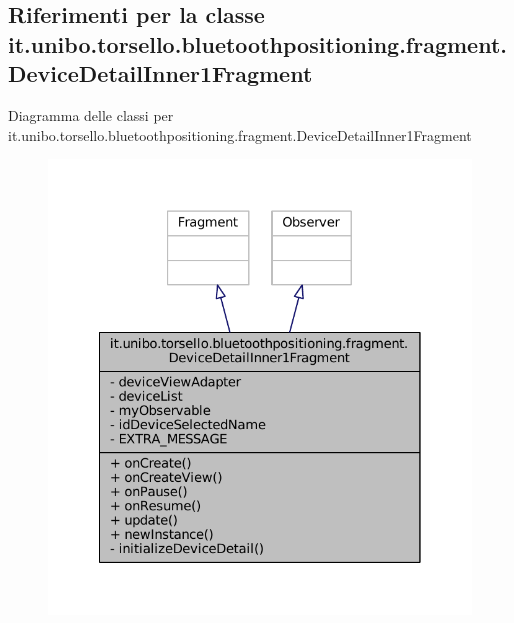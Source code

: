 \hypertarget{classit_1_1unibo_1_1torsello_1_1bluetoothpositioning_1_1fragment_1_1DeviceDetailInner1Fragment}{}\subsection{Riferimenti per la classe it.\+unibo.\+torsello.\+bluetoothpositioning.\+fragment.\+Device\+Detail\+Inner1\+Fragment}
\label{classit_1_1unibo_1_1torsello_1_1bluetoothpositioning_1_1fragment_1_1DeviceDetailInner1Fragment}


Diagramma delle classi per it.\+unibo.\+torsello.\+bluetoothpositioning.\+fragment.\+Device\+Detail\+Inner1\+Fragment
\nopagebreak
\begin{figure}[H]
\begin{center}
\leavevmode
\includegraphics[width=328pt]{classit_1_1unibo_1_1torsello_1_1bluetoothpositioning_1_1fragment_1_1DeviceDetailInner1Fragment__inherit__graph}
\end{center}
\end{figure}


